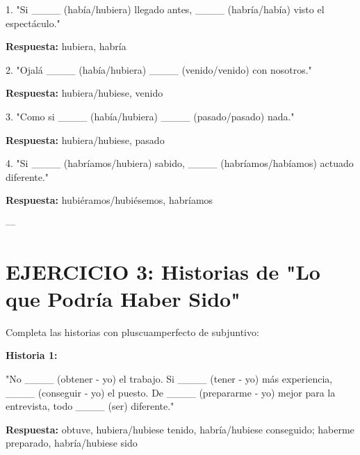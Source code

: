 \documentclass[a4paper,11pt]{article}
\begin{document}
\vspace{0.2cm}

1. "Si ____ (había/hubiera) llegado antes, ____ (habría/había) visto el espectáculo."

\textbf{Respuesta:} hubiera, habría

\vspace{0.2cm}

2. "Ojalá ____ (había/hubiera) ____ (venido/venido) con nosotros."

\textbf{Respuesta:} hubiera/hubiese, venido

\vspace{0.2cm}

3. "Como si ____ (había/hubiera) ____ (pasado/pasado) nada."

\textbf{Respuesta:} hubiera/hubiese, pasado

\vspace{0.2cm}

4. "Si ____ (habríamos/hubiera) sabido, ____ (habríamos/habíamos) actuado diferente."

\textbf{Respuesta:} hubiéramos/hubiésemos, habríamos

\vspace{0.2cm}

---

\vspace{0.2cm}

\section{EJERCICIO 3: Historias de "Lo que Podría Haber Sido"}

\vspace{0.2cm}

Completa las historias con pluscuamperfecto de subjuntivo:

\vspace{0.2cm}

\textbf{Historia 1:}

"No ____ (obtener - yo) el trabajo. Si ____ (tener - yo) más experiencia, ____ (conseguir - yo) el puesto. De ____ (prepararme - yo) mejor para la entrevista, todo ____ (ser) diferente."

\vspace{0.2cm}

\textbf{Respuesta:} obtuve, hubiera/hubiese tenido, habría/hubiese conseguido; haberme preparado, habría/hubiese sido

\vspace{0.2cm}
\end{document}
